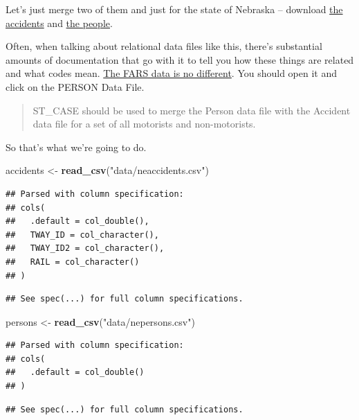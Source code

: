 \documentclass[]{book}
\newenvironment{Shaded}{\begin{snugshade}}{\end{snugshade}}
\newcommand{\KeywordTok}[1]{\textcolor[rgb]{0.13,0.29,0.53}{\textbf{#1}}}
\newcommand{\NormalTok}[1]{#1}
\newcommand{\StringTok}[1]{\textcolor[rgb]{0.31,0.60,0.02}{#1}}
\begin{document}
Let's just merge two of them and just for the state of Nebraska -- download \href{https://unl.box.com/s/1h79r809xsmu1vcsszcobvf3fj9ect8k}{the accidents} and \href{https://unl.box.com/s/5rp7li8ukq4e8eoy5ymjuzs1a21ba7bv}{the people}.

Often, when talking about relational data files like this, there's substantial amounts of documentation that go with it to tell you how these things are related and what codes mean. \href{https://crashstats.nhtsa.dot.gov/Api/Public/ViewPublication/812827}{The FARS data is no different}. You should open it and click on the PERSON Data File.

\begin{quote}
ST\_CASE should be used to merge the Person data file with the Accident data file for a set of all motorists and non-motorists.
\end{quote}

So that's what we're going to do.

\begin{Shaded}
\begin{Highlighting}[]
\NormalTok{accidents <-}\StringTok{ }\KeywordTok{read_csv}\NormalTok{(}\StringTok{"data/neaccidents.csv"}\NormalTok{)}
\end{Highlighting}
\end{Shaded}

\begin{verbatim}
## Parsed with column specification:
## cols(
##   .default = col_double(),
##   TWAY_ID = col_character(),
##   TWAY_ID2 = col_character(),
##   RAIL = col_character()
## )
\end{verbatim}

\begin{verbatim}
## See spec(...) for full column specifications.
\end{verbatim}

\begin{Shaded}
\begin{Highlighting}[]
\NormalTok{persons <-}\StringTok{ }\KeywordTok{read_csv}\NormalTok{(}\StringTok{"data/nepersons.csv"}\NormalTok{)}
\end{Highlighting}
\end{Shaded}

\begin{verbatim}
## Parsed with column specification:
## cols(
##   .default = col_double()
## )
\end{verbatim}

\begin{verbatim}
## See spec(...) for full column specifications.
\end{verbatim}
\end{document}
